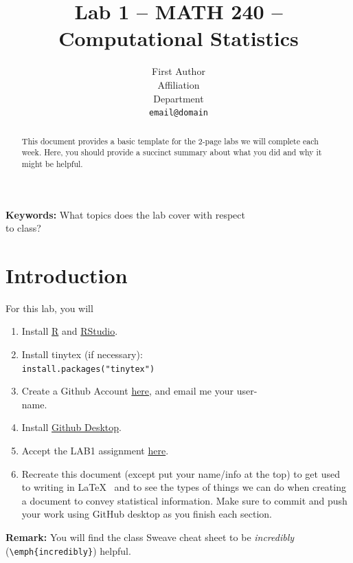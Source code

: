 \documentclass{article}\usepackage[]{graphicx}\usepackage[]{xcolor}
\begin{document}
\vspace{-1in}
\title{Lab 1 -- MATH 240 -- Computational Statistics}

\author{
  First Author \\
  Affiliation  \\
  Department  \\
  {\tt email@domain}
}

\date{}

\maketitle

\begin{multicols}{2}
\begin{abstract}
This document provides a basic template for the
 2-page labs we will complete each week. Here, you
 should provide a succinct summary about what you
 did and why it might be helpful.
\end{abstract}

\textbf{Keywords:} What topics does the lab cover with respect \\
 to class?

\section{Introduction}
For this lab, you will
\begin{enumerate}
  \item Install \href{https://github.com/}{R} and \href{https://posit.co/download/rstudio-desktop/}{RStudio}.
  \item Install tinytex (if necessary): \\
  \texttt{install.packages("tinytex")}
  \item Create a Github Account \href{https://github.com/}{here}, and email me your user-\\ 
  name.
  \item Install \href{https://desktop.github.com/}{Github Desktop}.
  \item Accept the LAB1 assignment \href{https://classroom.github.com/a/gfC_xMMl}{here}.
  \item Recreate this document (except put your name/info at 
   the top) to get used to writing in \LaTeX~ and to see the 
   types of things we can do when creating a document 
   to convey statistical information. Make sure to commit 
   and push your work using GitHub desktop as you finish 
   each section.
\end{enumerate}
\textbf{Remark:} You will find the class Sweave cheat sheet to
be \emph{incredibly} (\verb|\emph{incredibly}|) helpful.



\end{multicols}
\end{document}
